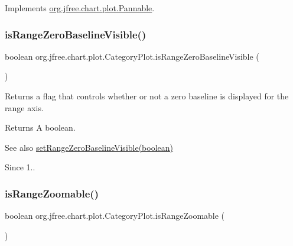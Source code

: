 Implements \mbox{\hyperlink{interfaceorg_1_1jfree_1_1chart_1_1plot_1_1_pannable_ad1e4f1dde36baf9964ac14654aab4f8e}{org.\+jfree.\+chart.\+plot.\+Pannable}}.

\mbox{\label{classorg_1_1jfree_1_1chart_1_1plot_1_1_category_plot_a32cccbcca493597d95bf54338573cc0a}} 
\subsubsection{\texorpdfstring{is\+Range\+Zero\+Baseline\+Visible()}{isRangeZeroBaselineVisible()}}
{\footnotesize\ttfamily boolean org.\+jfree.\+chart.\+plot.\+Category\+Plot.\+is\+Range\+Zero\+Baseline\+Visible (\begin{DoxyParamCaption}{ }\end{DoxyParamCaption})}

Returns a flag that controls whether or not a zero baseline is displayed for the range axis.

\begin{DoxyReturn}{Returns}
A boolean.
\end{DoxyReturn}
\begin{DoxySeeAlso}{See also}
\mbox{\hyperlink{classorg_1_1jfree_1_1chart_1_1plot_1_1_category_plot_a8c045c78c8456162ac2c58f4d2fe015d}{set\+Range\+Zero\+Baseline\+Visible(boolean)}}
\end{DoxySeeAlso}
\begin{DoxySince}{Since}
1.. 
\end{DoxySince}
\mbox{\label{classorg_1_1jfree_1_1chart_1_1plot_1_1_category_plot_ae3587c02157e69eeb8909513982e3d23}} 
\subsubsection{\texorpdfstring{is\+Range\+Zoomable()}{isRangeZoomable()}}
{\footnotesize\ttfamily boolean org.\+jfree.\+chart.\+plot.\+Category\+Plot.\+is\+Range\+Zoomable (\begin{DoxyParamCaption}{ }\end{DoxyParamCaption})}

